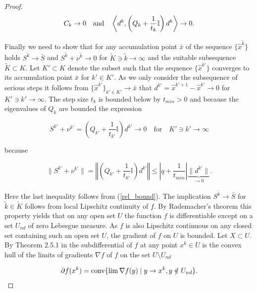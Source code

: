 \begin{proof}
	\begin{equation*}
		C_k \to 0 \quad \text{and} \quad \left\langle d^k,\left(Q_k+\frac{1}{t_k}\mathbb{I}\right)d^k\right\rangle \to 0.
	\end{equation*}
	
	Finally we need to show that for any accumulation point \(\bar{x}\) of the sequence \(\{\hat{x}^{\tilde{k}}\}\) holds \(S^{\tilde{k}} \to \bar{S}\) and \(S^{\tilde{k}}+\nu^{\tilde{k}} \to 0\) for \(\tilde{K} \ni {\tilde{k}} \to \infty\) and the suitable subsequence \(\tilde{K} \subset K\).
Let \({K'} \subset K\) denote the subset such that the sequence \(\{\hat{x}^{k'}\}\) converges to its accumulation point \(\bar{x}\) for \(k' \in K'\). %
As we only consider the subsequence of serious steps it follows from \(\{\hat{x}^{k'}\}_{k' \in K'} \to \bar{x}\) that  \(d^{{k'}} = \hat{x}^{{k'}+1}-\hat{x}^{{k'}} \to 0\) for \({K'} \ni {k'} \to \infty \). The step size \(t_k\) is bounded below by \(t_{min} > 0\) and because the eigenvalues of \(Q_k\) are bounded the expression 
	
	\begin{equation*}
	 S^{{k'}} + \nu^{{k'}} = \left(Q_{{k'}}+\frac{1}{t_{{k'}}}\mathbb{I} \right)d^{{k'}}  \to 0 \quad \text{for} \quad {K'} \ni {k'} \to \infty
	\end{equation*}
	
	because 
	
	\[ \lVert S^{{k'}} + \nu^{{k'}} \rVert = \left\Vert\left(Q_{{k'}}+\frac{1}{t_{{k'}}}\mathbb{I}\right)d^{{k'}} \right\Vert \leq \left \vert q + \frac{1}{t_{min}}\right\vert \underbrace{\|d^{{k'}}\|}_{\to 0}.\]
	
	Here the last inequality follows from (\ref{rel_bound}).
	The implication \(S^{\tilde{k}} \to \bar{S}\) for \({\tilde{k}} \in \tilde{K}\) follows from local Lipschitz continuity of \(f\).
	By Rademacher's theorem this property yields that on any open set \(U\) the function \(f\) is differentiable except on a set \(U_{nd}\) of zero Lebesgue measure. As \(f\) is also Lipschitz continuous on any closed set containing such an open set \(U\), the gradient of \(f\) on \(U\) is bounded.
	Let \(X \subset U\). By Theorem 2.5.1 in \cite[p. 63]{Clarke1990} the subdifferential of \(f\) at any point \(x^k \in U\) is the convex hull of the limits of gradients \(\nabla f\) of \(f\) on the set \(U\setminus U_{nd}\)
	
		\[ \partial f(x^k) = \text{conv}\{\lim \nabla f(y) \mid y \to x^k, y \notin U_{nd}\}. \]
		

\end{proof}
